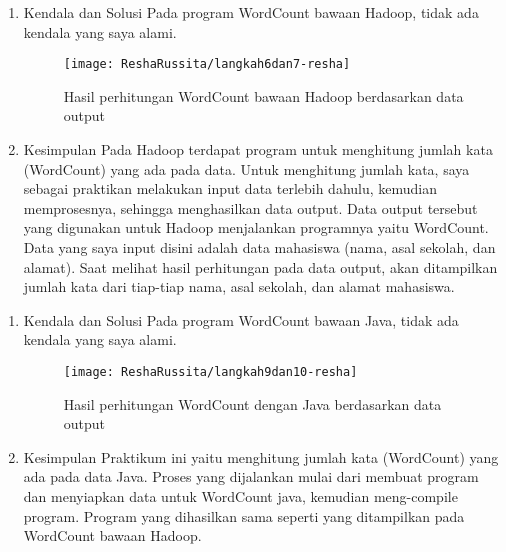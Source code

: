 \begin{enumerate}
\item Kendala dan Solusi
\newline Pada program WordCount bawaan Hadoop, tidak ada kendala yang saya alami.

\begin{figure}[!ht]
\texttt{[image: ReshaRussita/langkah6dan7-resha]}
\caption{Hasil perhitungan WordCount bawaan Hadoop berdasarkan data output}
\label{gam:perkuliahan-08-12}
\end{figure}

\item Kesimpulan
\newline Pada Hadoop terdapat program untuk menghitung jumlah kata (WordCount) yang ada pada data. Untuk menghitung jumlah kata, saya sebagai praktikan melakukan input data terlebih dahulu, kemudian memprosesnya, sehingga menghasilkan data output. Data output tersebut yang digunakan untuk Hadoop menjalankan programnya yaitu WordCount.
Data yang saya input disini adalah data mahasiswa (nama, asal sekolah, dan alamat). Saat melihat hasil perhitungan pada data output, akan ditampilkan jumlah kata dari tiap-tiap nama, asal sekolah, dan alamat mahasiswa.

\end{enumerate}

\begin{enumerate}
\item Kendala dan Solusi
\newline Pada program WordCount bawaan Java, tidak ada kendala yang saya alami.

\begin{figure}[!ht]
\texttt{[image: ReshaRussita/langkah9dan10-resha]}
\caption{Hasil perhitungan WordCount dengan Java berdasarkan data output}
\label{gam:perkuliahan-08-12}
\end{figure}

\item Kesimpulan
\newline Praktikum ini yaitu menghitung jumlah kata (WordCount) yang ada pada data Java. Proses yang dijalankan mulai dari membuat program dan menyiapkan data untuk WordCount java, kemudian meng-compile program. Program yang dihasilkan sama seperti yang ditampilkan pada WordCount bawaan Hadoop.
\end{enumerate}

